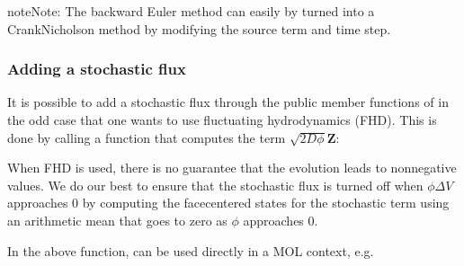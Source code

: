 \documentclass[letterpaper,10pt,english]{sphinxmanual}
\begin{document}
\begin{sphinxadmonition}{note}{Note:}
The backward Euler method can easily by turned into a Crank\sphinxhyphen{}Nicholson method by modifying the source term and time step.
\end{sphinxadmonition}


\subsubsection{Adding a stochastic flux}
\label{\detokenize{Solvers/CDR:adding-a-stochastic-flux}}
It is possible to add a stochastic flux through the public member functions of  in the odd case that one wants to use fluctuating hydrodynamics (FHD).
This is done by calling a function that computes the term \(\sqrt{2D\phi}\mathbf{Z}\):

\begin{sphinxVerbatim}[commandchars=\\\{\},formatcom=\scriptsize]
     
\end{sphinxVerbatim}

When FHD is used, there is no guarantee that the evolution leads to non\sphinxhyphen{}negative values.
We do our best to ensure that the stochastic flux is turned off when \(\phi \Delta V\) approaches 0 by computing the face\sphinxhyphen{}centered states for the stochastic term using an arithmetic mean that goes to zero as \(\phi\) approaches 0.

In the above function,  can be used directly in a MOL context, e.g.
\end{document}
